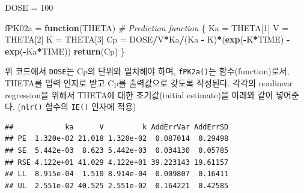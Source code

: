 \documentclass[
  11pt,
  krantz2, a4paper, twoside]{krantz}
\newenvironment{Shaded}{\begin{snugshade}}{\end{snugshade}}
\newcommand{\AttributeTok}[1]{\textcolor[rgb]{0.13,0.29,0.53}{#1}}
\newcommand{\CommentTok}[1]{\textcolor[rgb]{0.56,0.35,0.01}{\textit{#1}}}
\newcommand{\ControlFlowTok}[1]{\textcolor[rgb]{0.13,0.29,0.53}{\textbf{#1}}}
\newcommand{\DecValTok}[1]{\textcolor[rgb]{0.00,0.00,0.81}{#1}}
\newcommand{\FloatTok}[1]{\textcolor[rgb]{0.00,0.00,0.81}{#1}}
\newcommand{\FunctionTok}[1]{\textcolor[rgb]{0.13,0.29,0.53}{\textbf{#1}}}
\newcommand{\NormalTok}[1]{#1}
\newcommand{\OtherTok}[1]{\textcolor[rgb]{0.56,0.35,0.01}{#1}}
\newcommand{\SpecialCharTok}[1]{\textcolor[rgb]{0.81,0.36,0.00}{\textbf{#1}}}
\newcommand{\StringTok}[1]{\textcolor[rgb]{0.31,0.60,0.02}{#1}}
\theoremstyle{definition}
\theoremstyle{definition}
\theoremstyle{definition}
\theoremstyle{definition}
\theoremstyle{remark}
\begin{document}
\begin{Shaded}
\begin{Highlighting}[]
\NormalTok{DOSE }\OtherTok{=} \DecValTok{100}

\NormalTok{fPK02a }\OtherTok{=} \ControlFlowTok{function}\NormalTok{(THETA) }\CommentTok{\# Prediction function}
\NormalTok{\{}
\NormalTok{  Ka }\OtherTok{=}\NormalTok{ THETA[}\DecValTok{1}\NormalTok{]}
\NormalTok{  V  }\OtherTok{=}\NormalTok{ THETA[}\DecValTok{2}\NormalTok{]}
\NormalTok{  K  }\OtherTok{=}\NormalTok{ THETA[}\DecValTok{3}\NormalTok{]}
\NormalTok{  Cp }\OtherTok{=}\NormalTok{ DOSE}\SpecialCharTok{/}\NormalTok{V}\SpecialCharTok{*}\NormalTok{Ka}\SpecialCharTok{/}\NormalTok{(Ka }\SpecialCharTok{{-}}\NormalTok{ K)}\SpecialCharTok{*}\NormalTok{(}\FunctionTok{exp}\NormalTok{(}\SpecialCharTok{{-}}\NormalTok{K}\SpecialCharTok{*}\NormalTok{TIME) }\SpecialCharTok{{-}} \FunctionTok{exp}\NormalTok{(}\SpecialCharTok{{-}}\NormalTok{Ka}\SpecialCharTok{*}\NormalTok{TIME))}
  \FunctionTok{return}\NormalTok{(Cp)}
\NormalTok{\}}
\end{Highlighting}
\end{Shaded}

위 코드에서 \texttt{DOSE}는 Cp의 단위와 일치해야 하며, \texttt{fPK2a()}는 함수(function)로서, THETA를 입력 인자로 받고 Cp를 출력값으로 갖도록 작성된다.
각각의 nonlinear regression을 위해서 THETA에 대한 초기값(initial estimate)을 아래와 같이 넣어준다. (\texttt{nlr()} 함수의 \texttt{IE()} 인자에 적용)

\begin{Shaded}
\end{Shaded}

\begin{verbatim}
##            ka      V         k AddErrVar AddErrSD
## PE  1.320e-02 21.018 1.320e-02  0.087014  0.29498
## SE  5.442e-03  8.623 5.442e-03  0.034130  0.05785
## RSE 4.122e+01 41.029 4.122e+01 39.223143 19.61157
## LL  8.915e-04  1.510 8.914e-04  0.009807  0.16411
## UL  2.551e-02 40.525 2.551e-02  0.164221  0.42585
\end{verbatim}
\end{document}
